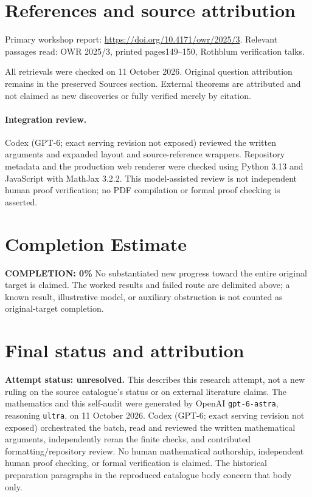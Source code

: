 \documentclass[11pt]{article}
\begin{document}
\section{References and source attribution}
Primary workshop report: \url{https://doi.org/10.4171/owr/2025/3}. Relevant passages read: OWR 2025/3, printed pages149--150, Rothblum verification talks.

All retrievals were checked on 11 October 2026. Original question attribution remains in the preserved Sources section. External theorems are attributed and not claimed as new discoveries or fully verified merely by citation.


\paragraph{Integration review.} Codex (GPT-6; exact serving revision not exposed) reviewed the written arguments and expanded layout and source-reference wrappers. Repository metadata and the production web renderer were checked using Python 3.13 and JavaScript with MathJax 3.2.2. This model-assisted review is not independent human proof verification; no PDF compilation or formal proof checking is asserted.

\section{Completion Estimate}
\noindent\textbf{COMPLETION: 0\%}
No substantiated new progress toward the entire original target is claimed. The worked results and failed route are delimited above; a known result, illustrative model, or auxiliary obstruction is not counted as original-target completion.

\section{Final status and attribution}
\textbf{Attempt status: unresolved.} This describes this research attempt, not a new ruling on the source catalogue's status or on external literature claims.
The mathematics and this self-audit were generated by OpenAI \texttt{gpt-6-astra}, reasoning \texttt{ultra}, on 11 October 2026. Codex (GPT-6; exact serving revision not exposed) orchestrated the batch, read and reviewed the written mathematical arguments, independently reran the finite checks, and contributed formatting/repository review. No human mathematical authorship, independent human proof checking, or formal verification is claimed. The historical preparation paragraphs in the reproduced catalogue body concern that body only.
\end{document}
